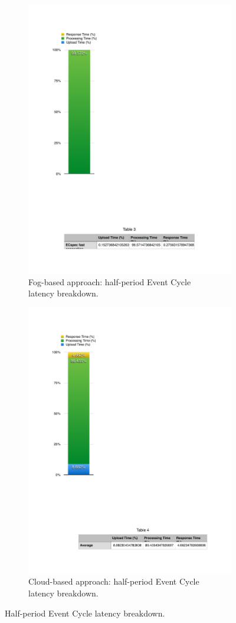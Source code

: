 \begin{figure}[ht!]
  \centering
  \begin{subfigure}{.5\textwidth}
    \centering
    \includegraphics[width=.4\linewidth]{./images/ecspec_fast_local_breakdown}
    \caption{Fog-based approach: half-period Event Cycle\\ latency breakdown.}
    \label{fig:ecspec_fast_local}
  \end{subfigure}%
  \begin{subfigure}{.5\textwidth}
    \centering
    \includegraphics[width=.4\linewidth]{./images/ecspec_fast_cloud_breakdown}
    \caption{Cloud-based approach: half-period Event Cycle\\ latency breakdown.}
    \label{fig:ecspec_fast_cloud}
  \end{subfigure}
  \caption{Half-period Event Cycle latency breakdown.}
  \label{fig:ecspec_fast_breakdown}
\end{figure}

